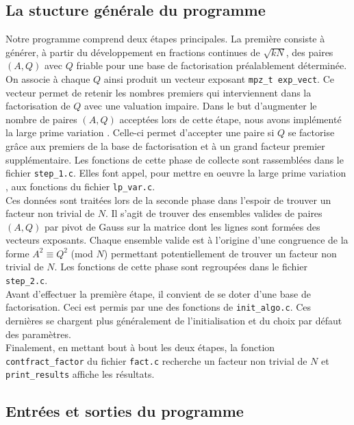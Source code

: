 \subsection{La stucture générale du programme}

Notre programme comprend deux étapes principales. La première consiste à générer, 
à partir du développement en fractions continues de $ \sqrt{kN} $, des paires 
$(A, Q)$ avec $Q$ friable pour une base de factorisation préalablement déterminée.
On associe à chaque $Q$ ainsi produit un vecteur exposant \texttt{mpz\_t exp\_vect}.
Ce vecteur permet de retenir les nombres premiers qui interviennent dans la 
factorisation de $Q$ avec une valuation impaire. Dans le but d'augmenter le nombre
de paires $(A,Q) $ acceptées lors de cette étape, nous avons implémenté la \og 
large prime variation \fg{}. Celle-ci permet d'accepter une paire si $Q$ se factorise  grâce
aux premiers de la base de factorisation et à un grand facteur premier 
supplémentaire. Les fonctions de cette phase de collecte sont rassemblées dans le
fichier \texttt{step\_1.c}. Elles font appel, pour mettre en oeuvre la 
\og large prime variation \fg{}, aux fonctions du fichier \texttt{lp\_var.c}. \\
 
Ces données sont traitées lors de la seconde phase dans l'espoir de trouver un 
facteur non trivial de $N$. Il s'agit de trouver des ensembles valides de paires
$(A, Q)$ par pivot de Gauss sur la matrice dont les lignes sont formées des 
vecteurs exposants. Chaque ensemble valide est à l'origine d'une congruence de 
la forme $A^2 \equiv Q^2$ (mod $N$) permettant potentiellement de trouver un
facteur non trivial de $N$. Les fonctions de cette phase sont regroupées dans 
le fichier \texttt{step\_2.c}. \\

Avant d'effectuer la première étape, il convient de se doter d'une base de 
factorisation. Ceci est permis par une des fonctions de \texttt{init\_algo.c}.
Ces dernières se chargent plus généralement de l'initialisation et du choix par
défaut des paramètres. \\

Finalement, en mettant bout à bout les deux étapes, la fonction 
\texttt{contfract\_factor} du fichier \texttt{fact.c} recherche un facteur
non trivial de $N$ et \texttt{print\_results} affiche les résultats. 

\subsection{Entrées et sorties du programme}

